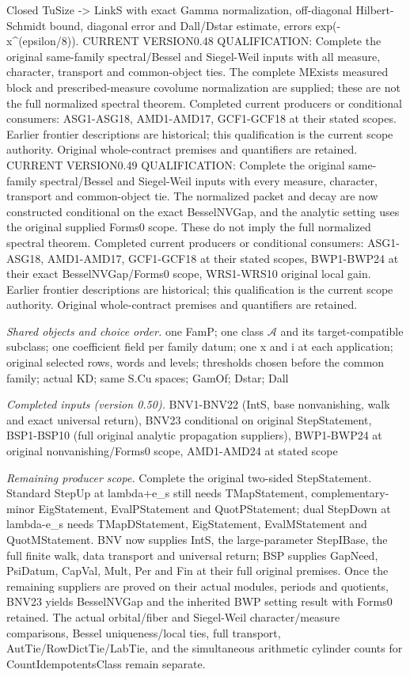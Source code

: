 Closed TuSize -> LinkS with exact Gamma normalization, off-diagonal Hilbert-Schmidt bound, diagonal error and Dall/Dstar estimate, errors exp(-x\textasciicircum{}(epsilon/8)). CURRENT VERSION0.48 QUALIFICATION: Complete the original same-family spectral/Bessel and Siegel-Weil inputs with all measure, character, transport and common-object ties. The complete MExists measured block and prescribed-measure covolume normalization are supplied; these are not the full normalized spectral theorem. Completed current producers or conditional consumers: ASG1-ASG18, AMD1-AMD17, GCF1-GCF18 at their stated scopes. Earlier frontier descriptions are historical; this qualification is the current scope authority. Original whole-contract premises and quantifiers are retained. CURRENT VERSION0.49 QUALIFICATION: Complete the original same-family spectral/Bessel and Siegel-Weil inputs with every measure, character, transport and common-object tie. The normalized packet and decay are now constructed conditional on the exact BesselNVGap, and the analytic setting uses the original supplied Forms0 scope. These do not imply the full normalized spectral theorem. Completed current producers or conditional consumers: ASG1-ASG18, AMD1-AMD17, GCF1-GCF18 at their stated scopes, BWP1-BWP24 at their exact BesselNVGap/Forms0 scope, WRS1-WRS10 original local gain. Earlier frontier descriptions are historical; this qualification is the current scope authority. Original whole-contract premises and quantifiers are retained.

\emph{Shared objects and choice order.} one FamP; one class $\mathcal A$ and its target-compatible subclass; one coefficient field per family datum; one x and i at each application; original selected rows, words and levels; thresholds chosen before the common family; actual KD; same S.Cu spaces; GamOf; Dstar; Dall

\emph{Completed inputs (version 0.50).} BNV1-BNV22 (IntS, base nonvanishing, walk and exact universal return), BNV23 conditional on original StepStatement, BSP1-BSP10 (full original analytic propagation suppliers), BWP1-BWP24 at original nonvanishing/Forms0 scope, AMD1-AMD24 at stated scope

\emph{Remaining producer scope.} Complete the original two-sided StepStatement. Standard StepUp at lambda+e\_\allowbreak s still needs TMapStatement, complementary-minor EigStatement, EvalPStatement and QuotPStatement; dual StepDown at lambda-e\_\allowbreak s needs TMapDStatement, EigStatement, EvalMStatement and QuotMStatement. BNV now supplies IntS, the large-parameter StepIBase, the full finite walk, data transport and universal return; BSP supplies GapNeed, PsiDatum, CapVal, Mult, Per and Fin at their full original premises. Once the remaining suppliers are proved on their actual modules, periods and quotients, BNV23 yields BesselNVGap and the inherited BWP setting result with Forms0 retained. The actual orbital/fiber and Siegel-Weil character/measure comparisons, Bessel uniqueness/local ties, full transport, AutTie/RowDictTie/LabTie, and the simultaneous arithmetic cylinder counts for CountIdempotentsClass remain separate.

